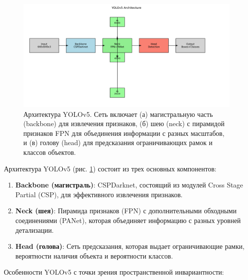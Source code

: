 \begin{figure}[ht]
\centering
\includegraphics[width=\textwidth]{Dissertation/images/yolov5_architecture.png}
\caption{Архитектура YOLOv5. Сеть включает (а) магистральную часть (backbone) для извлечения признаков, (б) шею (neck) с пирамидой признаков FPN для объединения информации с разных масштабов, и (в) голову (head) для предсказания ограничивающих рамок и классов объектов.}
\label{fig:yolov5_architecture}
\end{figure}

Архитектура YOLOv5 (рис. \ref{fig:yolov5_architecture}) состоит из трех основных компонентов:

\begin{enumerate}
    \item \textbf{Backbone (магистраль)}: CSPDarknet, состоящий из модулей Cross Stage Partial (CSP), для эффективного извлечения признаков.
    
    \item \textbf{Neck (шея)}: Пирамида признаков (FPN) с дополнительными обходными соединениями (PANet), которая объединяет информацию с разных уровней детализации.
    
    \item \textbf{Head (голова)}: Сеть предсказания, которая выдает ограничивающие рамки, вероятности наличия объекта и вероятности классов.
\end{enumerate}

Особенности YOLOv5 с точки зрения пространственной инвариантности:

